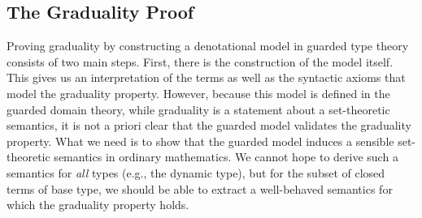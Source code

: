 

\subsection{The Graduality Proof}

Proving graduality by constructing a denotational model in guarded type theory
consists of two main steps. First, there is the construction of the model
itself. This gives us an interpretation of the terms as well as the syntactic
axioms that model the graduality property. However, because this model is
defined in the guarded domain theory, while graduality is a statement about a
set-theoretic semantics, it is not a priori clear that the guarded model
validates the graduality property.
%
What we need is to show that the guarded model induces a sensible set-theoretic
semantics in ordinary mathematics. We cannot hope to derive such a semantics for
\emph{all} types (e.g., the dynamic type), but for the subset of closed terms of
base type, we should be able to extract a well-behaved semantics for which the
graduality property holds.



